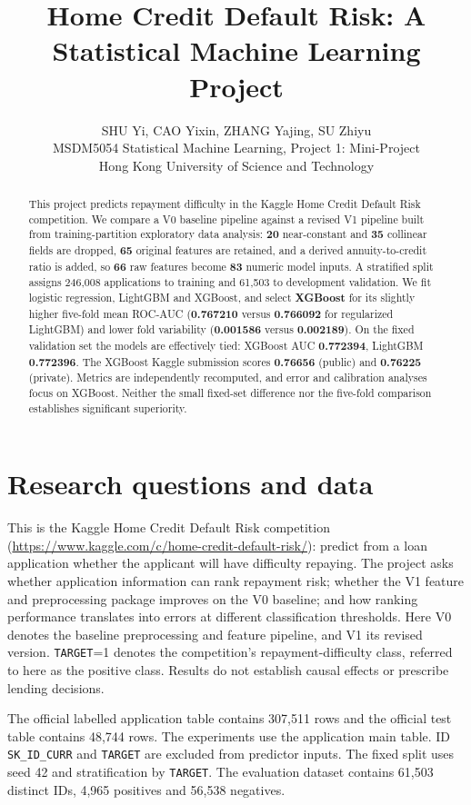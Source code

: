\documentclass{article}
\title{Home Credit Default Risk: A Statistical Machine Learning Project}
\author{%
  SHU Yi, CAO Yixin, ZHANG Yajing, SU Zhiyu \\
  MSDM5054 Statistical Machine Learning, Project 1: Mini-Project \\
  Hong Kong University of Science and Technology
}
\begin{document}
\maketitle

\begin{abstract}
This project predicts repayment difficulty in the Kaggle Home Credit Default Risk competition. We compare a V0 baseline pipeline against a revised V1 pipeline built from training-partition exploratory data analysis: \textbf{20} near-constant and \textbf{35} collinear fields are dropped, \textbf{65} original features are retained, and a derived annuity-to-credit ratio is added, so \textbf{66} raw features become \textbf{83} numeric model inputs. A stratified split assigns 246,008 applications to training and 61,503 to development validation. We fit logistic regression, LightGBM and XGBoost, and select \textbf{XGBoost} for its slightly higher five-fold mean ROC-AUC (\textbf{0.767210} versus \textbf{0.766092} for regularized LightGBM) and lower fold variability (\textbf{0.001586} versus \textbf{0.002189}). On the fixed validation set the models are effectively tied: XGBoost AUC \textbf{0.772394}, LightGBM \textbf{0.772396}. The XGBoost Kaggle submission scores \textbf{0.76656} (public) and \textbf{0.76225} (private). Metrics are independently recomputed, and error and calibration analyses focus on XGBoost. Neither the small fixed-set difference nor the five-fold comparison establishes significant superiority.
\end{abstract}

\section{Research questions and data}
This is the Kaggle Home Credit Default Risk competition (\url{https://www.kaggle.com/c/home-credit-default-risk/}): predict from a loan application whether the applicant will have difficulty repaying. The project asks whether application information can rank repayment risk; whether the V1 feature and preprocessing package improves on the V0 baseline; and how ranking performance translates into errors at different classification thresholds. Here V0 denotes the baseline preprocessing and feature pipeline, and V1 its revised version. \texttt{TARGET}=1 denotes the competition's repayment-difficulty class, referred to here as the positive class. Results do not establish causal effects or prescribe lending decisions.

The official labelled application table contains 307,511 rows and the official test table contains 48,744 rows. The experiments use the application main table. ID \texttt{SK\_ID\_CURR} and \texttt{TARGET} are excluded from predictor inputs. The fixed split uses seed 42 and stratification by \texttt{TARGET}. The evaluation dataset contains 61,503 distinct IDs, 4,965 positives and 56,538 negatives.
\end{document}
